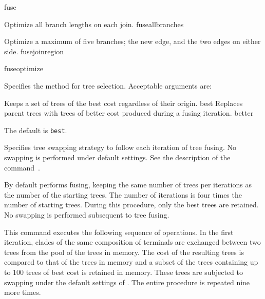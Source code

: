 \begin{command}{fuse}{}
\begin{arguments}
{\begin{description}
                    {Optimize all branch lengths on each join.}
                    {fuseallbranches}

                    {Optimize a maximum of five branches; the new edge, and the two
                    edges on either side.}
                    {fusejoinregion}

            \end{description}
            }
            {fuseoptimize}

            {Specifies the method for tree selection. Acceptable arguments
            are:
            \begin{description}
                  {}
                 {Keeps a set of trees of the best cost regardless of their origin.}
                 {best}
                  {}
                 {Replaces parent trees with trees of better cost
                produced during a fusing iteration.}
                {better}
                      \end{description}
            The default is \texttt{best}.}
            {}

            {Specifies tree swapping strategy to follow each iteration of tree fusing.
            No swapping is performed under default settings.
            See the description of the command~.}
            {}
            
    \end{arguments}
    
        {By default \poy performs fusing, keeping the same number of trees per
        iterations as the number of the starting trees. The number of iterations is
        four times the number of starting trees. During this procedure, only the best
        trees are retained. No swapping is performed subsequent to tree fusing.}
        
    \begin{poyexamples}
	
            {This command executes the following sequence of operations. In the
            first iteration, clades of the same composition of terminals are exchanged
            between two trees from the pool of the trees in memory. The cost of the
            resulting trees is compared to that of the trees in memory and a subset of
            the trees containing up to 100 trees of best cost is retained in memory.
            These trees are subjected to swapping under the default settings of
            . The entire procedure is repeated nine more times.}
            

\end{poyexamples}
\end{command}
